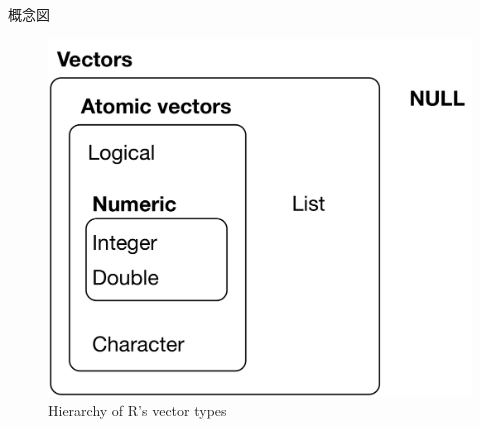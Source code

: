 \documentclass[
  ignorenonframetext,
]{beamer}
\begin{document}
\begin{frame}{概念図}
\protect\hypertarget{ux6982ux5ff5ux56f3}{}
\begin{figure}
\centering
\includegraphics{../img/data-structures-overview.png}
\caption{Hierarchy of R's vector types}
\end{figure}
\end{frame}
\end{document}
